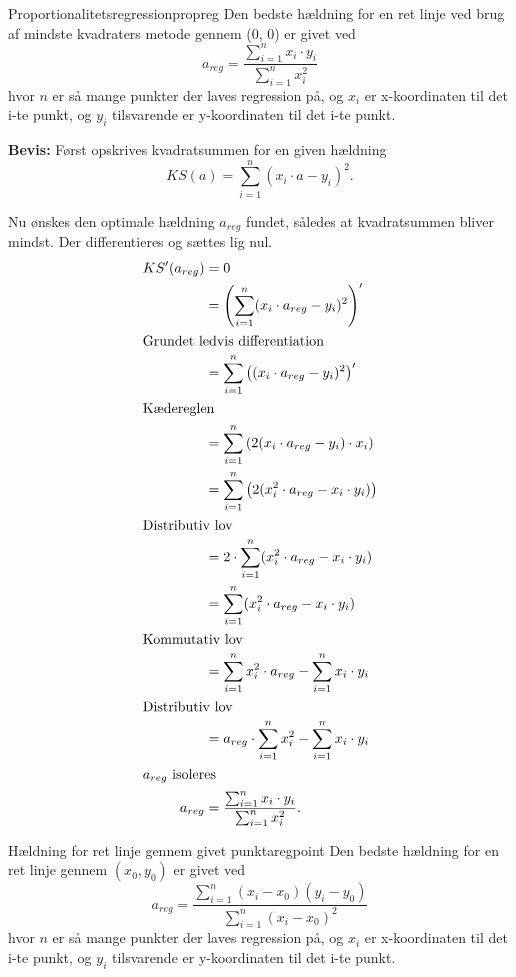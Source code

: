 \documentclass{article}
\begin{document}
\begin{theorem}{Proportionalitetsregression}{propreg}
	Den bedste hældning for en ret linje ved brug af mindste kvadraters metode
	gennem (0, 0) er givet ved
	\[
	    a_{reg} = \frac{\sum_{i=1}^n x_i \cdot y_i}{\sum_{i=1}^n x_i^2}
	\] 
	hvor $n$ er så mange punkter der laves regression på, og $x_i$ er x-koordinaten
	til det i-te punkt, og $y_i$ tilsvarende er y-koordinaten til det i-te punkt.
\end{theorem}

\textbf{Bevis:}
Først opskrives kvadratsummen for en given hældning
\[
	KS(a) = \sum_{i=1}^n (x_i \cdot a - y_i)^2.
\] 

Nu ønskes den optimale hældning $a_{reg}$ fundet, således at kvadratsummen bliver
mindst. Der differentieres og sættes lig nul.
\begin{align*}
	KS'(a_{reg}) &= 0\\
				 &= \left(\sum_{i=1}^n (x_i \cdot a_{reg} - y_i)^2\right)'\\
\intertext{Grundet ledvis differentiation}
				 &= \sum_{i=1}^n \left((x_i \cdot a_{reg} - y_i)^2\right)'\\
				 \intertext{Kædereglen}
				 &= \sum_{i=1}^n \left(2(x_i \cdot a_{reg} - y_i) \cdot x_i\right)\\
				 &= \sum_{i=1}^n \left(2(x_i^2 \cdot a_{reg} - x_i \cdot y_i)\right)\\
				 \intertext{Distributiv lov}
				 &= 2 \cdot \sum_{i=1}^n (x_i^2 \cdot a_{reg} - x_i \cdot y_i)\\
				 &= \sum_{i=1}^n (x_i^2 \cdot a_{reg} - x_i \cdot y_i)\\
				 \intertext{Kommutativ lov}
				 &= \sum_{i=1}^n x_i^2 \cdot a_{reg} - \sum_{i=1}^n x_i \cdot y_i\\
				 \intertext{Distributiv lov}
				 &= a_{reg} \cdot \sum_{i=1}^n x_i^2 - \sum_{i=1}^n x_i \cdot y_i\\
				 \intertext{$a_{reg}$ isoleres}
	     a_{reg} &=  \frac{\sum_{i=1}^n x_i \cdot y_i}{\sum_{i=1}^n x_i^2}.
\end{align*}

\begin{theorem}{Hældning for ret linje gennem givet punkt}{aregpoint}
	Den bedste hældning for en ret linje gennem $(x_0, y_0)$ er givet ved
	\[
		a_{reg} = \frac{\sum_{i=1}^n (x_i-x_0)(y_i-y_0)}{\sum_{i=1}^n (x_i-x_0)^2}
	\] 
	hvor $n$ er så mange punkter der laves regression på, og $x_i$ er x-koordinaten
	til det i-te punkt, og $y_i$ tilsvarende er y-koordinaten til det i-te punkt.
\end{theorem}
\end{document}
